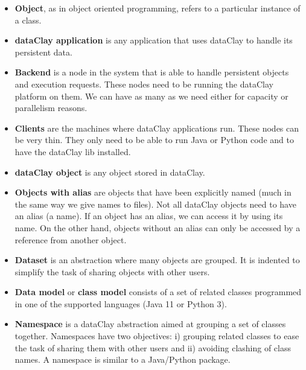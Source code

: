 \begin{itemize}

\item {\bf Object}, as in object oriented programming, refers to a particular instance of a class.

\item {\bf dataClay application} is any application that uses dataClay to handle its persistent data. 

\item {\bf Backend} is a node in the system that is able to handle persistent objects and execution requests. These nodes need to be running the dataClay platform on them. We can have as many as we need either for capacity or parallelism reasons.

\item {\bf Clients} are the machines where dataClay applications run. These nodes can be very thin. They only need to be able to run Java or Python code and to have the dataClay lib installed.

\item {\bf dataClay object} is any object stored in dataClay.

\item {\bf Objects with alias} are objects that have been explicitly named (much in the same way we give names to files). Not all dataClay objects need to have an alias (a name). If an object has an alias, we can access it by using its name. On the other hand, objects without an alias can only be accessed by a reference from another object. 

\item {\bf Dataset} is an abstraction where many objects are grouped. It is indented to simplify the task of sharing objects with other users.

\item {\bf Data model} or \textbf{class model} consists of a set of related classes programmed in one of the supported languages (Java 11 or Python 3).

\item {\bf Namespace}  is a dataClay abstraction aimed at grouping a set of classes together. Namespaces have two objectives: i) grouping related classes to ease the task of sharing them with other users and ii) avoiding clashing of class names. A namespace is similar to a Java/Python package.

\end{itemize}

